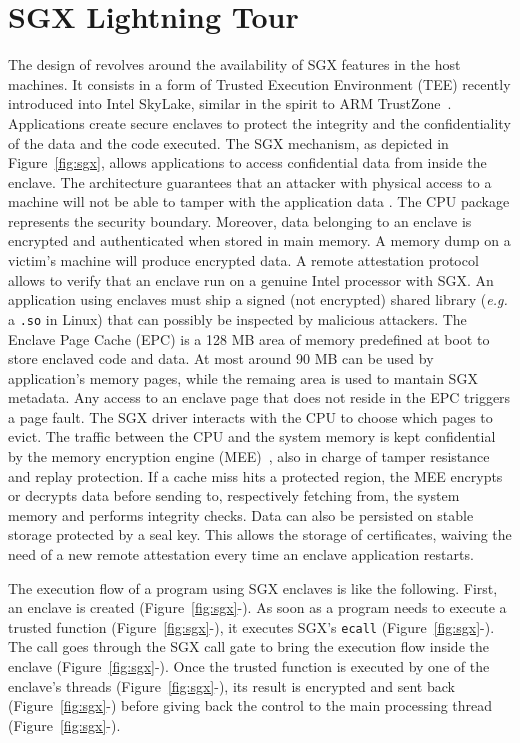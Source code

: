 \section{SGX Lightning Tour}
\label{sec:background}
The design of \SYS revolves around the availability of SGX features in the host machines. 
It consists in a form of Trusted Execution Environment (TEE) recently introduced into Intel SkyLake, similar in the spirit to ARM TrustZone~\cite{arm2009security}. 
Applications create secure enclaves to protect the integrity and the confidentiality of the data and the code executed. 
The SGX mechanism, as depicted in Figure~\ref{fig:sgx}, allows applications to access confidential data from inside the enclave. 
The architecture guarantees that an attacker with physical access to a machine will not be able to tamper with the application data . 
The CPU package represents the security boundary. 
Moreover, data belonging to an enclave is encrypted and authenticated when stored in main memory. 
A memory dump on a victim’s machine will produce encrypted data. 
A remote attestation protocol allows to verify that an enclave run on a genuine Intel processor with SGX. 
An application using enclaves must ship a signed (not encrypted) shared library (\emph{e.g.} a \texttt{.so} in Linux) that can possibly be inspected by malicious attackers. 
The Enclave Page Cache (EPC) is a 128 MB area of memory predefined at boot to store enclaved code and data. 
At most around 90 MB can be used by application’s memory pages, while the remaing area is used to mantain SGX metadata. 
Any access to an enclave page that does not reside in the EPC triggers a page fault. 
The SGX driver interacts with the CPU to choose which pages to evict. 
The traffic between the CPU and the system memory is kept confidential by the memory encryption engine (MEE)~\cite{gueron2016memory}, also in charge of tamper resistance and replay protection. 
If a cache miss hits a protected region, the MEE encrypts or decrypts data before sending to, respectively fetching from, the system memory and performs integrity checks. 
Data can also be persisted on stable storage protected by a seal key. 
This allows the storage of certificates, waiving the need of a new remote attestation every time an enclave application restarts.

The execution flow of a program using SGX enclaves is like the following.
First, an enclave is created (Figure~\ref{fig:sgx}-).
As soon as a program needs to execute a trusted function (Figure~\ref{fig:sgx}-), it executes SGX's \texttt{ecall} (Figure~\ref{fig:sgx}-).
The call goes through the SGX call gate to bring the execution flow inside the enclave (Figure~\ref{fig:sgx}-).
Once the trusted function is executed by one of the enclave's threads (Figure~\ref{fig:sgx}-), its result is encrypted and sent back (Figure~\ref{fig:sgx}-) before giving back the control to the main processing thread (Figure~\ref{fig:sgx}-).
